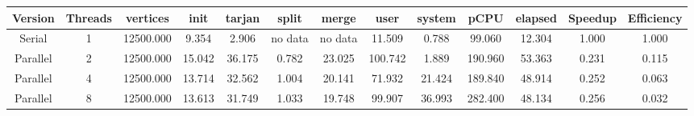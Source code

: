 \begin{tabular}{|c|c|c|c|c|c|c|c|c|c|c|c|c|}
\toprule
 Version &  Threads &  vertices &   init &  tarjan &   split &   merge &    user &  system &    pCPU &  elapsed &  Speedup &  Efficiency \\
\midrule
  Serial &        1 & 12500.000 &  9.354 &   2.906 & no data & no data &  11.509 &   0.788 &  99.060 &   12.304 &    1.000 &       1.000 \\
Parallel &        2 & 12500.000 & 15.042 &  36.175 &   0.782 &  23.025 & 100.742 &   1.889 & 190.960 &   53.363 &    0.231 &       0.115 \\
Parallel &        4 & 12500.000 & 13.714 &  32.562 &   1.004 &  20.141 &  71.932 &  21.424 & 189.840 &   48.914 &    0.252 &       0.063 \\
Parallel &        8 & 12500.000 & 13.613 &  31.749 &   1.033 &  19.748 &  99.907 &  36.993 & 282.400 &   48.134 &    0.256 &       0.032 \\
\bottomrule
\end{tabular}
